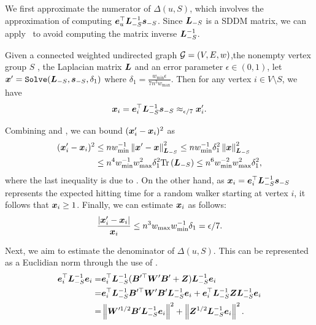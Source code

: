 \documentclass[journal]{IEEEtran}
\begin{document}
We first approximate the numerator of \(\Delta(u,S)\), which involves the approximation of computing \(\boldsymbol{e}_u^\top\boldsymbol{L}_{-S}^{-1}\boldsymbol{s}_{-S}\).
Since \(\boldsymbol{L}_{-S}\) is a SDDM matrix, we can apply~ to avoid computing the matrix inverse \(\boldsymbol{L}_{-S}^{-1}\).
\begin{lemma}\label{lem:approx-numer}
    Given a connected weighted undirected graph \(\mathcal{G}=(V,E,w)\),the nonempty vertex group \(S\) , the Laplacian matrix \(\boldsymbol{L}\) and an error parameter \(\epsilon\in(0,1)\), let \(\boldsymbol{x}'=\mathtt{Solve}(\boldsymbol{L}_{-S},\boldsymbol{s}_{-S},\delta_1)\) where \(\delta_1=\frac{w_{\min}\epsilon}{7n^3w_{\max}}\). Then for any vertex \(i\in V\setminus S\), we have
    \begin{equation}\label{eq:approx-numer}
        \boldsymbol{x}_i=\boldsymbol{e}_i^\top\boldsymbol{L}_{-S}^{-1}\boldsymbol{s}_{-S}\approx_{\epsilon/7}\boldsymbol{x}'_i.
    \end{equation}
\end{lemma}
\begin{IEEEproof}

    Combining  and , we can bound \((\boldsymbol{x}'_i-\boldsymbol{x}_i)^2\) as
    \begin{align*}
        (\boldsymbol{x}'_i-\boldsymbol{x}_i)^2
         & \le nw_{\min}^{-1}\left\Vert\boldsymbol{x}'-\boldsymbol{x}\right\Vert^2_{\boldsymbol{L}_{-S}}
        \le nw_{\min}^{-1}\delta_1^2\left\Vert\boldsymbol{x}\right\Vert^2_{\boldsymbol{L}_{-S}}        \\
         & \le n^4w_{\min}^{-1}w_{\max}^2\delta_1^2\mathrm{Tr}\left(\boldsymbol{L}_{-S}\right)
        \le n^6w_{\min}^{-2}w_{\max}^2\delta_1^2,
    \end{align*}
    where the last inequality is due to .
    On the other hand, as \(\boldsymbol{x}_i=\boldsymbol{e}_i^\top\boldsymbol{L}_{-S}^{-1}\boldsymbol{s}_{-S}\) represents the expected hitting time for a random walker starting at vertex \(i\), it follows that \(\boldsymbol{x}_i\ge1\).
    Finally, we can estimate \(\boldsymbol{x}_i\) as follows:
    \begin{equation*}
        \frac{\left|\boldsymbol{x}'_i-\boldsymbol{x}_i \right|}{\boldsymbol{x}_i}\le n^3w_{\max}w_{\min}^{-1}\delta_1=\epsilon/7.
    \end{equation*}
\end{IEEEproof}

Next, we aim to estimate the denominator of \(\Delta(u,S)\). This can be represented as a Euclidian norm through the use of .
\begin{equation}\label{eq:denom-solver}
    \begin{split}
        \boldsymbol{e}_i^\top\boldsymbol{L}_{-S}^{-1}\boldsymbol{e}_i
        =&\boldsymbol{e}_i^\top\boldsymbol{L}_{-S}^{-1}(\boldsymbol{B}'^\top\boldsymbol{W}'\boldsymbol{B}'+\boldsymbol{Z})\boldsymbol{L}_{-S}^{-1}\boldsymbol{e}_i\\
        =&\boldsymbol{e}_i^\top\boldsymbol{L}_{-S}^{-1}\boldsymbol{B}'^\top\boldsymbol{W}'\boldsymbol{B}'\boldsymbol{L}_{-S}^{-1}\boldsymbol{e}_i+\boldsymbol{e}_i^\top\boldsymbol{L}_{-S}^{-1}\boldsymbol{Z}\boldsymbol{L}_{-S}^{-1}\boldsymbol{e}_i\\
        =&\left\Vert\boldsymbol{W}'^{1/2}\boldsymbol{B}'\boldsymbol{L}_{-S}^{-1}\boldsymbol{e}_i\right\Vert^2+\left\Vert\boldsymbol{Z}^{1/2}\boldsymbol{L}_{-S}^{-1}\boldsymbol{e}_i\right\Vert^2.
    \end{split}
\end{equation}
\end{document}
